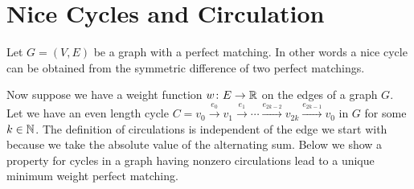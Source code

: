 \section{Nice Cycles and Circulation}
Let $G=(V,E)$ be a graph with a perfect matching. 
\parinf In other words a nice cycle can be obtained from the symmetric difference of two perfect matchings.\parinn

Now suppose we have a weight function $w\colon E\to \mathbb{R}$ on the edges of a graph $G$. Let we have an even length cycle $C=v_0\overset{e_0}{\longrightarrow}v_1\overset{e_1}{\longrightarrow}\cdots \overset{e_{2k-2}}{\longrightarrow}v_{2k}\overset{e_{2k-1}}{\longrightarrow}v_0$ in $G$ for some $k\in \mathbb{N}$.
The definition of circulations is independent of the edge we start with because we take the absolute value of the alternating sum. Below we show a property for cycles in a graph having nonzero circulations lead to a unique minimum weight perfect matching.



